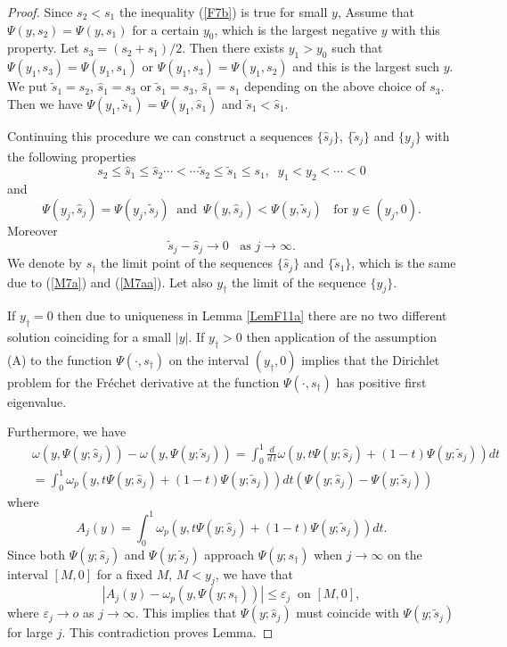 \documentclass[10pt,a4paper]{amsart}
\begin{document}
\begin{proof} Since $s_2<s_1$ the inequality (\ref{F7b}) is true for small $y$,
Assume that $\Psi(y,s_2)=\Psi(y,s_1)$ for a certain $y_0$, which is the largest negative $y$ with this property. Let $s_3=(s_2+s_1)/2$. Then there exists $y_1>y_0$ such that $\Psi(y_1,s_3)=\Psi(y_1,s_1)$ or $\Psi(y_1,s_3)=\Psi(y_1,s_2)$ and this is the largest such $y$. We put $\tilde{s}_1=s_2$, $\hat{s}_1=s_3$ or $\tilde{s}_1=s_3$, $\hat{s}_1=s_1$ depending on the above choice of $s_3$. Then we have $\Psi(y_1,\tilde{s}_1)=\Psi(y_1,\hat{s}_1)$ and  $\tilde{s}_1<\hat{s}_1$.

Continuing this procedure we can construct a sequences $\{\hat{s}_j\}$, $\{\tilde{s}_j\}$ and $\{y_j\}$ with the following properties
\begin{equation}\label{M7a}
s_2\leq\hat{s}_1\leq\hat{s}_2\cdots <\cdots \tilde{s}_2\leq\tilde{s}_1\leq s_1,\;\; y_1<y_2<\cdots <0
\end{equation}
and
 $$
 \Psi(y_j,\hat{s}_j)=\Psi(y_j,\tilde{s}_j)\;\;
 \mbox{and}\:\;\Psi(y,\hat{s}_j)<\Psi(y,\tilde{s}_j)\;\;\mbox{ for $y\in (y_j,0)$}.
 $$
Moreover
\begin{equation}\label{M7aa}
\tilde{s}_j-\hat{s}_j\to 0\;\;\mbox{ as $j\to\infty$}.
\end{equation}
We denote by $s_\dag$ the limit point of the sequences $\{\hat{s}_j\}$ and $\{\tilde{s}_1\}$, which is the same due to (\ref{M7a}) and (\ref{M7aa}). Let also $y_\dag$ the limit of the sequence $\{y_j\}$.

If $y_\dag=0$ then due to uniqueness in Lemma \ref{LemF11a} there are no two different solution coinciding for a small $|y|$. If $y_\dag>0$ then application of the assumption
(A) to the function $\Psi(\cdot,s_\dag)$ on the interval $(y_\dag,0)$ implies that the Dirichlet problem  for the Fr\'{e}chet derivative at the function $\Psi(\cdot,s_\dag)$ has positive first eigenvalue.

Furthermore, we have
\begin{eqnarray*}
&&\omega(y,\Psi(y;\hat{s}_j))-\omega(y,\Psi(y;\tilde{s}_j))=
\int_0^1\frac{d}{d\,t}\omega(y,t\Psi(y;\hat{s}_j)+(1-t)\Psi(y;\tilde{s}_j))dt\\
&&=\int_0^1\omega_p(y,t\Psi(y;\hat{s}_j)+(1-t)\Psi(y;\tilde{s}_j))dt
(\Psi(y;\hat{s}_j)-\Psi(y;\tilde{s}_j))
\end{eqnarray*}
where
$$
A_j(y)=\int_0^1\omega_p(y,t\Psi(y;\hat{s}_j)+(1-t)\Psi(y;\tilde{s}_j))dt.
$$
Since both $\Psi(y;\hat{s}_j)$ and $\Psi(y;\tilde{s}_j)$ approach $\Psi(y;s_\dag)$ when $j\to\infty$ on the interval $[M,0]$ for a fixed $M$, $M<y_j$, we have that
$$
|A_j(y)-\omega_p(y,\Psi(y;s_\dag))|\leq \varepsilon_j\;\;\mbox{on $[M,0]$},
$$
where $\varepsilon_j\to o$ as $j\to\infty$. This implies that $\Psi(y;\hat{s}_j)$ must coincide with $\Psi(y;\tilde{s}_j)$ for large $j$. This contradiction proves Lemma.

\end{proof}
\end{document}
